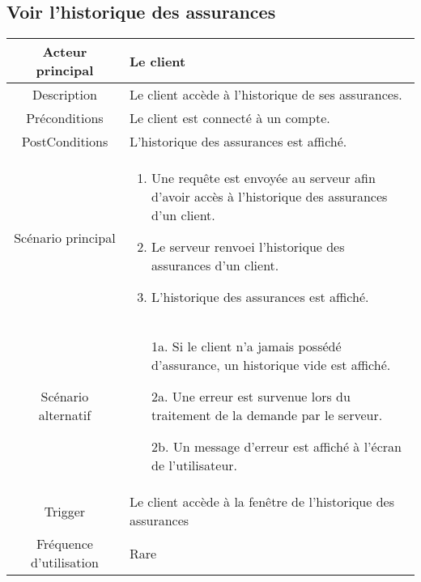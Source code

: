 \documentclass[]{article}
\begin{document}
\newpage

\subsection{Voir l'historique des assurances}
\begin{table}[h]
    \begin{tabular}{|c|p{10cm}|}
       \hline
       Acteur principal&Le client\\
       \hline
       Description&Le client accède à l'historique de ses assurances.\\
       \hline
       Préconditions&Le client est connecté à un compte.\\
       \hline
       PostConditions&L'historique des assurances est affiché.\\
       \hline
       Scénario principal& 
             \begin{enumerate}
                \item Une requête est envoyée au serveur afin d'avoir accès à l'historique des assurances d'un client.
                \item Le serveur renvoei l'historique des assurances d'un client.
                \item L'historique des assurances est affiché.
             \end{enumerate}     \\
       \hline
       Scénario alternatif&
        \begin{itemize}
            \item[1a.] Si le client n'a jamais possédé d'assurance, un historique vide est affiché.
            \item[2a.] Une erreur est survenue lors du traitement de la demande par le serveur.
            \item[2b.] Un message d'erreur est affiché à l'écran de l'utilisateur. 
        \end{itemize}
       \\
       \hline
       Trigger&Le client accède à la fenêtre de l'historique des assurances\\
       \hline
       Fréquence d'utilisation&Rare\\
       \hline
    \end{tabular}
 \end{table}

\newpage

\end{document}
